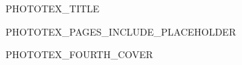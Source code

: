 \documentclass[11pt, a4paper, twoside, openright]{book}
\begin{document}
\pagestyle{empty}

\begin{titlepage}
  \begin{center}
    {\Huge PHOTOTEX_TITLE}
  \end{center}
\end{titlepage}
\newpage\null\thispagestyle{empty}\newpage%

PHOTOTEX_PAGES_INCLUDE_PLACEHOLDER

\newcommand*\cleartoleftpage{%
  \clearpage
  \ifodd\value{page}\hbox{}\newpage\fi
}

\cleartoleftpage%
\begin{center}
  {\Huge PHOTOTEX_FOURTH_COVER}
\end{center}

\end{document}
